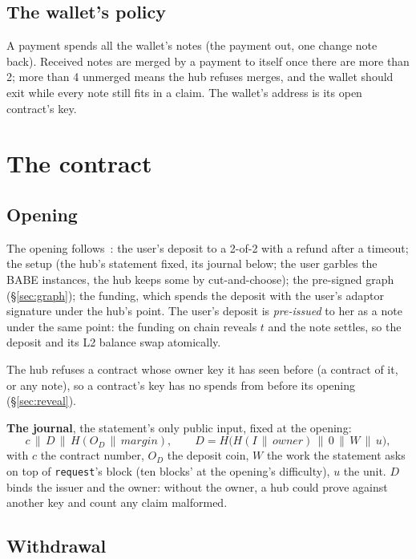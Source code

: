 \documentclass[11pt]{article}
\newcommand{\tx}[1]{\texttt{#1}}
\begin{document}
\subsection{The wallet's policy}

A payment spends all the wallet's notes (the payment out, one change
note back). Received notes are merged by a payment to itself once there
are more than 2; more than 4 unmerged means the hub refuses merges, and
the wallet should exit while every note still fits in a claim. The
wallet's address is its open contract's key.

\section{The contract}

\subsection{Opening}

The opening follows~\cite{lichen}: the user's deposit to a 2-of-2 with
a refund after a timeout; the setup (the hub's statement fixed, its
journal below; the user garbles the BABE instances, the hub keeps some
by cut-and-choose); the pre-signed graph (\S\ref{sec:graph}); the
funding, which spends the deposit with the user's adaptor signature
under the hub's point. The user's deposit is \emph{pre-issued} to her as
a note under the same point: the funding on chain reveals $t$ and the
note settles, so the deposit and its L2 balance swap atomically.

The hub refuses a contract whose owner key it has seen before (a
contract of it, or any note), so a contract's key has no spends from
before its opening (\S\ref{sec:reveal}).

\textbf{The journal}, the statement's only public input, fixed at the
opening:
\[
  c \,\|\, D \,\|\, H(O_D \,\|\, \mathit{margin}),\qquad
  D = H\big(H(I \,\|\, \mathit{owner}) \,\|\, 0 \,\|\, W \,\|\, u\big),
\]
with $c$ the contract number, $O_D$ the deposit coin, $W$ the work the
statement asks on top of \tx{request}'s block (ten blocks' at the
opening's difficulty), $u$ the unit. $D$ binds the issuer and the
owner: without the owner, a hub could prove against another key and
count any claim malformed.

\subsection{Withdrawal}
\end{document}
